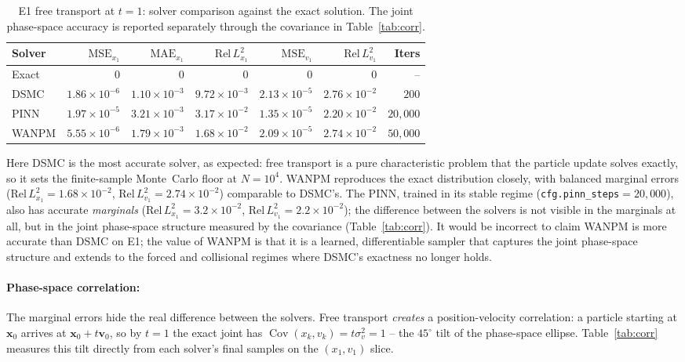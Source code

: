\documentclass[11pt]{article}
\newcommand{\vx}{\mathbf{x}}
\newcommand{\vv}{\mathbf{v}}
\newcommand{\relL}{\mathrm{Rel}\,L^2}
\theoremstyle{plain}
\begin{document}
\begin{table}[H]
\centering
\caption{E1 free transport at $t=1$: solver comparison against the exact solution.
The joint phase-space accuracy is reported separately through the covariance in Table~\ref{tab:corr}.}
\label{tab:summary1}
\small
\begin{tabular}{lrrrrrr}
\toprule
Solver & $\mathrm{MSE}_{x_1}$ & $\mathrm{MAE}_{x_1}$ & $\relL_{x_1}$ & $\mathrm{MSE}_{v_1}$ & $\relL_{v_1}$ & Iters\\
\midrule
Exact  & 0 & 0 & 0 & 0 & 0 & --\\
DSMC   & $1.86\!\times\!10^{-6}$ & $1.10\!\times\!10^{-3}$ & $9.72\!\times\!10^{-3}$ & $2.13\!\times\!10^{-5}$ & $2.76\!\times\!10^{-2}$ & $200$\\
PINN   & $1.97\!\times\!10^{-5}$ & $3.21\!\times\!10^{-3}$ & $3.17\!\times\!10^{-2}$ & $1.35\!\times\!10^{-5}$ & $2.20\!\times\!10^{-2}$ & $20{,}000$\\
WANPM  & $5.55\!\times\!10^{-6}$ & $1.79\!\times\!10^{-3}$ & $1.68\!\times\!10^{-2}$ & $2.09\!\times\!10^{-5}$ & $2.74\!\times\!10^{-2}$ & $50{,}000$\\
\bottomrule
\end{tabular}
\end{table}
Here DSMC is the most accurate solver, as expected: free transport is a pure characteristic problem that the particle update solves exactly, so it sets the finite-sample Monte~Carlo floor at $N=10^4$. WANPM reproduces the exact distribution closely, with balanced marginal errors ($\relL_{x_1}=1.68\times10^{-2}$, $\relL_{v_1}=2.74\times10^{-2}$) comparable to DSMC's. The PINN, trained in its stable regime (\texttt{cfg.pinn\_steps}$=20{,}000$), also has accurate \emph{marginals} ($\relL_{x_1}=3.2\times10^{-2}$, $\relL_{v_1}=2.2\times10^{-2}$); the difference between the solvers is not visible in the marginals at all, but in the joint phase-space structure measured by the covariance (Table~\ref{tab:corr}). It would be incorrect to claim WANPM is more accurate than DSMC on E1; the value of WANPM is that it is a learned, differentiable sampler that captures the joint phase-space structure and extends to the forced and collisional regimes where DSMC's exactness no longer holds.

\paragraph{Phase-space correlation: }



The marginal errors hide the real difference between the solvers. Free transport \emph{creates} a position-velocity correlation: a particle starting at $\vx_0$ arrives at $\vx_0+t\vv_0$, so by $t=1$ the exact joint has $\operatorname{Cov}(x_k,v_k)=t\sigma_v^2=1$ -- the $45^\circ$ tilt of the phase-space ellipse. Table~\ref{tab:corr} measures this tilt directly from each solver's final samples on the $(x_1,v_1)$ slice.
\end{document}
